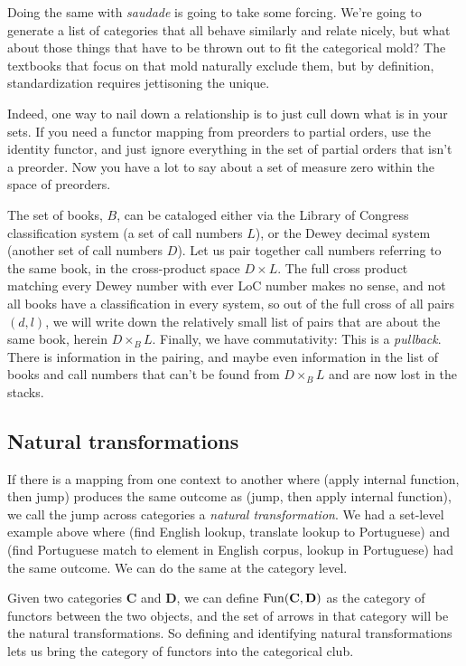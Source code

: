 \documentclass[11pt]{article}
\begin{document}
Doing the same with {\em saudade} is going to take some forcing.
We're going to generate a list of
categories that all behave similarly and relate nicely, but what about those things
that have to be thrown out to fit the categorical mold? The textbooks that focus on
that mold naturally exclude them, but by definition, standardization requires jettisoning 
the unique.

Indeed, one way to nail down a relationship is to just cull down what is in your sets.
If you need a functor mapping from preorders to partial orders, use the identity functor,
and just ignore everything in the set of partial orders that isn't a preorder. Now you
have a lot to say about a set of measure zero within the space of preorders.

The set of books, $B$, can be cataloged either via the Library of Congress classification system
(a set of call numbers $L$), or the Dewey decimal system (another set of call numbers
$D$). Let us pair together call numbers referring to the same book, in the cross-product
space $D\times L$. The full cross product matching every Dewey number with ever LoC
number makes no sense, and not all books have a classification in every system,
so out of the full cross of all pairs $(d, l)$, we will write down the relatively
small list of pairs that are about the same book, herein $D\times_B L$.  Finally,
we have commutativity:
This is a {\em pullback}. There is information in the pairing, and maybe even
information in the list of books and call numbers that can't be found from $D\times_B L$
and are now lost in the stacks.

\subsection{Natural transformations}
If there is a mapping from one context to another where (apply internal function,
then jump) produces the same outcome as (jump, then apply internal function), we call
the jump across categories a {\em natural transformation}. We had a set-level example
above where (find English lookup, translate lookup to Portuguese) and (find Portuguese
match to element in English corpus, lookup in Portuguese) had the same outcome. We can do
the same at the category level.

Given two categories {\bf C} and {\bf D}, we can define ${\rm Fun}({\bf C}, {\bf D})$ as
the category of functors between the two objects, and the set of arrows in that category
will be the natural transformations. So defining and identifying natural
transformations lets us bring the category of functors into the categorical club.
\end{document}
